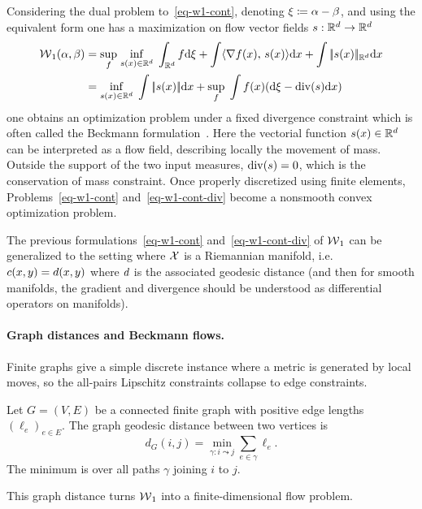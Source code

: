 Considering the dual problem to~\eqref{eq-w1-cont}, denoting $\xi \coloneqq \alpha-\beta$, and using the equivalent form
one has a maximization on flow vector fields $s :  \mathbb{R}^d \rightarrow \mathbb{R}^d$
\begin{align*}
	\operatorname{\mathcal{W}}_1(\alpha,\beta) &=
	\underset{f}{\sup}\; \underset{s(x) \in \mathbb{R}^d}{\inf}\; \int_{\mathbb{R}^d} f \mathrm{d}\xi + \int \langle \nabla f(x),\,s(x)\rangle \mathrm{d} x + \int |\!| s(x) |\!|_{\mathbb{R}^d} \mathrm{d} x \\
	&=
	\underset{s(x) \in \mathbb{R}^d}{\inf}\; \int |\!| s(x) |\!| \mathrm{d} x
		+ \underset{f}{\sup}\; \int f(x) ( \mathrm{d} \xi - \operatorname{div}(s) \mathrm{d} x)
\end{align*}
one obtains an optimization problem under a fixed divergence constraint
which is often called the Beckmann formulation~\cite{Beckmann52}.
%
Here the vectorial function $s(x) \in \mathbb{R}^d$ can be interpreted as a flow field, describing locally the movement of mass. Outside the support of the two input measures, $\operatorname{div}(s)=0$, which is the conservation of mass constraint.
%
Once properly discretized using finite elements, Problems~\eqref{eq-w1-cont} and~\eqref{eq-w1-cont-div} become a nonsmooth convex optimization problem.

The previous formulations~\eqref{eq-w1-cont} and~\eqref{eq-w1-cont-div} of $\operatorname{\mathcal{W}}_1$ can be generalized to the setting where $\mathcal{X}$ is a Riemannian manifold, i.e. $c(x,y)=d(x,y)$ where $d$ is the associated geodesic distance (and then for smooth manifolds, the gradient and divergence should be understood as differential operators on manifolds).

\paragraph{Graph distances and Beckmann flows.}
Finite graphs give a simple discrete instance where a metric is generated by local moves, so the all-pairs Lipschitz constraints collapse to edge constraints.

\begin{defn}\label{def-graph-geodesic-distance}
	Let $G=(V,E)$ be a connected finite graph with positive edge lengths $(\ell_e)_{e\in E}$. The graph geodesic distance between two vertices is
	\[
		d_G(i,j)=\min_{\gamma:i\leadsto j}\sum_{e\in\gamma}\ell_e.
	\]
	The minimum is over all paths $\gamma$ joining $i$ to $j$.
\end{defn}
This graph distance turns $\operatorname{\mathcal{W}}_1$ into a finite-dimensional flow problem.

